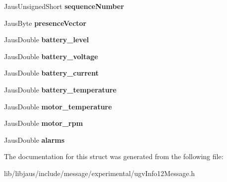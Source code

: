 \begin{DoxyCompactItemize}
\item 
\hypertarget{struct_u_g_v_info12_message_struct_a72476e287fc12623331563311313c506}{\-Jaus\-Unsigned\-Short {\bfseries sequence\-Number}}\label{struct_u_g_v_info12_message_struct_a72476e287fc12623331563311313c506}

\item 
\hypertarget{struct_u_g_v_info12_message_struct_a61045a9acee1edffa120115377bb23eb}{\-Jaus\-Byte {\bfseries presence\-Vector}}\label{struct_u_g_v_info12_message_struct_a61045a9acee1edffa120115377bb23eb}

\item 
\hypertarget{struct_u_g_v_info12_message_struct_af33d4a6cd80e05b5b6b5c3d8366be508}{\-Jaus\-Double {\bfseries battery\-\_\-level}}\label{struct_u_g_v_info12_message_struct_af33d4a6cd80e05b5b6b5c3d8366be508}

\item 
\hypertarget{struct_u_g_v_info12_message_struct_a5941b49996c593fb85181ed83830c9e0}{\-Jaus\-Double {\bfseries battery\-\_\-voltage}}\label{struct_u_g_v_info12_message_struct_a5941b49996c593fb85181ed83830c9e0}

\item 
\hypertarget{struct_u_g_v_info12_message_struct_a66a26e41d05059d5cc1ff06a988774ce}{\-Jaus\-Double {\bfseries battery\-\_\-current}}\label{struct_u_g_v_info12_message_struct_a66a26e41d05059d5cc1ff06a988774ce}

\item 
\hypertarget{struct_u_g_v_info12_message_struct_ae1283c9ed12b84ebc0edbead075d889b}{\-Jaus\-Double {\bfseries battery\-\_\-temperature}}\label{struct_u_g_v_info12_message_struct_ae1283c9ed12b84ebc0edbead075d889b}

\item 
\hypertarget{struct_u_g_v_info12_message_struct_aea931a2ef70b247f97436a4891001cdb}{\-Jaus\-Double {\bfseries motor\-\_\-temperature}}\label{struct_u_g_v_info12_message_struct_aea931a2ef70b247f97436a4891001cdb}

\item 
\hypertarget{struct_u_g_v_info12_message_struct_aedca61c78ffd712a00e23367b2601c0a}{\-Jaus\-Double {\bfseries motor\-\_\-rpm}}\label{struct_u_g_v_info12_message_struct_aedca61c78ffd712a00e23367b2601c0a}

\item 
\hypertarget{struct_u_g_v_info12_message_struct_aa84a9ccc2e296b047a01ff0dfbbc66c1}{\-Jaus\-Double {\bfseries alarms}}\label{struct_u_g_v_info12_message_struct_aa84a9ccc2e296b047a01ff0dfbbc66c1}

\end{DoxyCompactItemize}


\-The documentation for this struct was generated from the following file\-:\begin{DoxyCompactItemize}
\item 
lib/libjaus/include/message/experimental/ugv\-Info12\-Message.\-h\end{DoxyCompactItemize}
